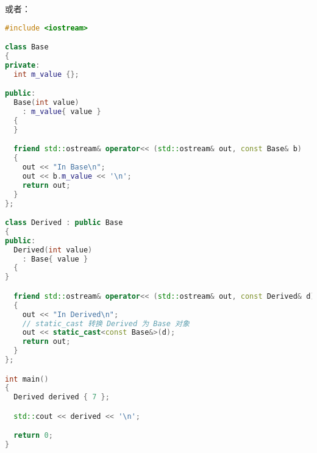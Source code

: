 \documentclass[../../LearnCpp.tex]{subfiles}
\begin{document}
或者：

\begin{lstlisting}[language=C++]
#include <iostream>

class Base
{
private:
  int m_value {};

public:
  Base(int value)
    : m_value{ value }
  {
  }

  friend std::ostream& operator<< (std::ostream& out, const Base& b)
  {
    out << "In Base\n";
    out << b.m_value << '\n';
    return out;
  }
};

class Derived : public Base
{
public:
  Derived(int value)
    : Base{ value }
  {
}

  friend std::ostream& operator<< (std::ostream& out, const Derived& d)
  {
    out << "In Derived\n";
    // static_cast 转换 Derived 为 Base 对象
    out << static_cast<const Base&>(d);
    return out;
  }
};

int main()
{
  Derived derived { 7 };

  std::cout << derived << '\n';

  return 0;
}
\end{lstlisting}
\end{document}
